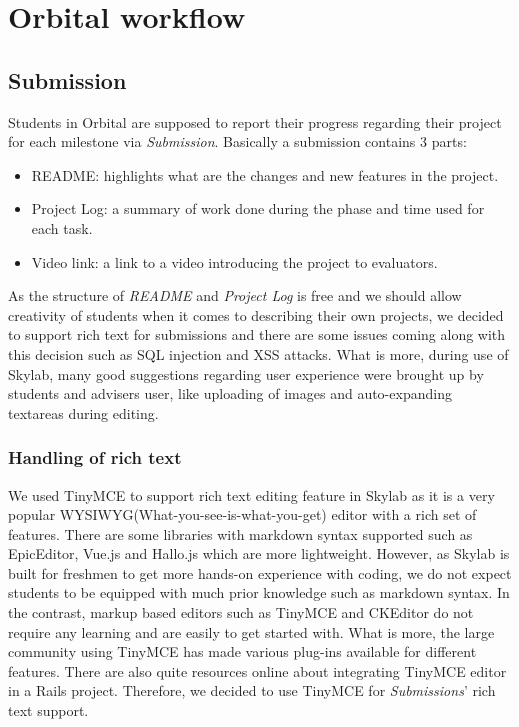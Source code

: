 \chapter{Orbital workflow} \label{workflow}

\section{Submission} \label{submission}

Students in Orbital are supposed to report their progress regarding their project for each milestone via \textit{Submission}. Basically a submission contains 3 parts:

\begin{itemize}
  \item README: highlights what are the changes and new features in the project.
  \item Project Log: a summary of work done during the phase and time used for each task.
  \item Video link: a link to a video introducing the project to evaluators.
\end{itemize}

As the structure of \textit{README} and \textit{Project Log} is free and we should allow creativity of students when it comes to describing their own projects, we decided to support rich text for submissions and there are some issues coming along with this decision such as SQL injection and XSS attacks. What is more, during use of Skylab, many good suggestions regarding user experience were brought up by students and advisers user, like uploading of images and auto-expanding textareas during editing.

\subsection{Handling of rich text}
We used TinyMCE to support rich text editing feature in Skylab as it is a very popular WYSIWYG(What-you-see-is-what-you-get) editor with a rich set of features\cite{citation10}. There are some libraries with markdown syntax supported such as EpicEditor, Vue.js and Hallo.js which are more lightweight. However, as Skylab is built for freshmen to get more hands-on experience with coding, we do not expect students to be equipped with much prior knowledge such as markdown syntax. In the contrast, markup based editors such as TinyMCE and CKEditor do not require any learning and are easily to get started with. What is more, the large community using TinyMCE has made various plug-ins available for different features. There are also quite resources online about integrating TinyMCE editor in a Rails project. Therefore, we decided to use TinyMCE for \textit{Submissions}' rich text support.

